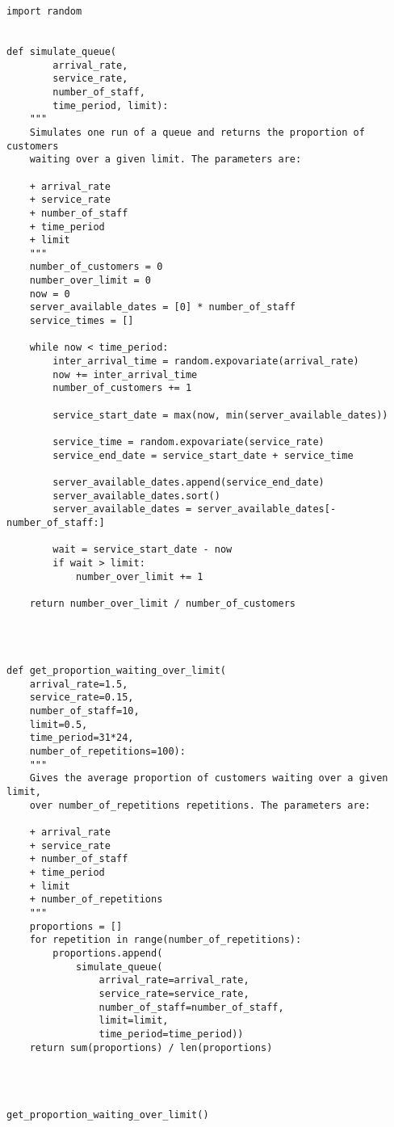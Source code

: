 \documentclass[border={10pt, 10pt, 10pt, 10pt}, varwidth=14cm]{standalone}
\begin{document}
\begin{verbatim}
import random


def simulate_queue(
        arrival_rate,
        service_rate,
        number_of_staff,
        time_period, limit):
    """
    Simulates one run of a queue and returns the proportion of customers
    waiting over a given limit. The parameters are:
    
    + arrival_rate
    + service_rate
    + number_of_staff
    + time_period
    + limit
    """
    number_of_customers = 0
    number_over_limit = 0
    now = 0
    server_available_dates = [0] * number_of_staff
    service_times = []

    while now < time_period:
        inter_arrival_time = random.expovariate(arrival_rate)
        now += inter_arrival_time
        number_of_customers += 1
        
        service_start_date = max(now, min(server_available_dates))
        
        service_time = random.expovariate(service_rate)
        service_end_date = service_start_date + service_time
        
        server_available_dates.append(service_end_date)
        server_available_dates.sort()
        server_available_dates = server_available_dates[-number_of_staff:]
                
        wait = service_start_date - now
        if wait > limit:
            number_over_limit += 1
    
    return number_over_limit / number_of_customers




def get_proportion_waiting_over_limit(
    arrival_rate=1.5,
    service_rate=0.15,
    number_of_staff=10,
    limit=0.5,
    time_period=31*24,
    number_of_repetitions=100):
    """
    Gives the average proportion of customers waiting over a given limit,
    over number_of_repetitions repetitions. The parameters are:
    
    + arrival_rate
    + service_rate
    + number_of_staff
    + time_period
    + limit
    + number_of_repetitions
    """
    proportions = []
    for repetition in range(number_of_repetitions):
        proportions.append(
            simulate_queue(
                arrival_rate=arrival_rate,
                service_rate=service_rate,
                number_of_staff=number_of_staff,
                limit=limit,
                time_period=time_period))
    return sum(proportions) / len(proportions)




get_proportion_waiting_over_limit()

\end{verbatim}
\end{document}
